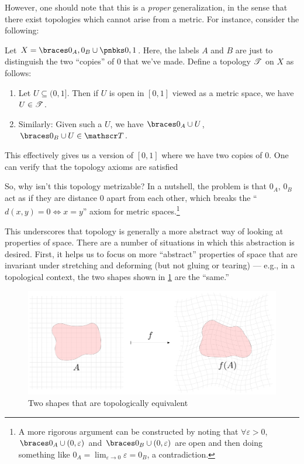 \documentclass{fkpaper}
\begin{document}
\begin{multicols}{2}
  However, one should note that this is a \emph{proper} generalization,
  in the sense that there exist topologies which cannot arise from a
  metric. For instance, consider the following:
  \begin{example}
    Let $X = \set{0_{A}, 0_{B}} \cup \pb{0, 1}$. Here, the labels $A$
    and $B$ are just to distinguish the two ``copies'' of $0$ that we've
    made. Define a topology ${\mathscr{T}}$ on $X$ as follows:
    \begin{enumerate}
      \item Let $U \subseteq (0,1]$. Then if $U$ is open in $[0,1]$
        viewed as a metric space, we have $U \in {\mathscr{T}}$.
      \item Similarly: Given such a $U$, we have $\set{0_A} \cup U$,
        $\set{0_B} \cup U \in \ms T$. \qedhere
    \end{enumerate}
  \end{example}
  This effectively gives us a version of $[0,1]$ where we have two
  copies of $0$. One can verify that the topology axioms are satisfied

  So, why isn't this topology metrizable? In a nutshell, the problem is
  that $0_A$, $0_B$ act as if they are distance $0$ apart from each
  other, which breaks the ``$d(x,y) = 0 \iff x = y$'' axiom for metric
  spaces.\footnote{A more rigorous argument can be constructed by noting
    that $\forall \varepsilon > 0$, $\set{0_A} \cup (0,\varepsilon)$ and
    $\set{0_B} \cup (0, \varepsilon)$ are open and then doing something
    like $0_A = \lim_{\varepsilon \to 0} \varepsilon = 0_B$, a
    contradiction.}

  This underscores that topology is generally a more abstract way of
  looking at properties of space. There are a number of situations in
  which this abstraction is desired. First, it helps us to focus on
  more ``abstract'' properties of space that are invariant under
  stretching and deforming (but not gluing or tearing) --- e.g., in a
  topological context, the two shapes shown in \cref{fig:deform-grid}
  are the ``same.''
\end{multicols}
\begin{figure}[H]
  \centering
  \includegraphics[scale=.325, angle=0]{figures/deform-grid.pdf}
  \caption{Two shapes that are topologically equivalent}
  \label{fig:deform-grid}
\end{figure}
\end{document}
